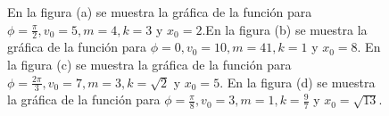 \documentclass[letterpaper,12pt,oneside]{book}
\begin{document}
\begin{figure}
\centering
{}
\caption{\protect{\label{oscilador}}  En la figura (a) se muestra la gr\'afica de la funci\'on para $\phi=\frac{\pi}{2},  v_0 = 5,  m=  4,  k=3  $ y $x_0=2.$En la figura (b) se muestra la gr\'afica de la funci\'on para $\phi=0,  v_0 = 10,  m=  41,  k= 1  $ y $x_0=8$.
En la figura (c) se muestra la gr\'afica de la funci\'on para $\phi=\frac{2\pi}{3},  v_0 = 7,  m=  3,  k=\sqrt{2}  $ y $x_0=5.$
En la figura (d) se muestra la gr\'afica de la funci\'on para $\phi=\frac{\pi}{8},  v_0 =  3,  m=  1,  k=\frac{9}{7}  $ y $x_0=\sqrt{13}.$}
\end{figure}
\end{document}
